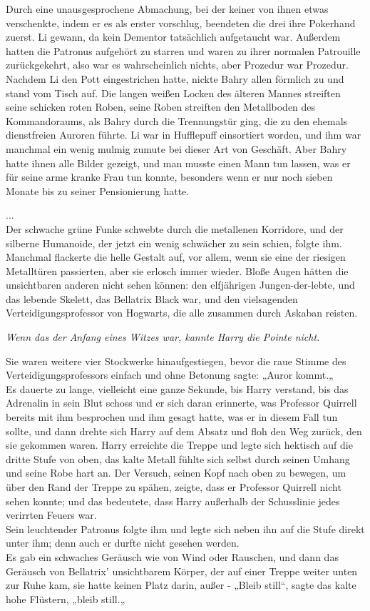 {Durch eine unausgesprochene Abmachung, bei der keiner von ihnen etwas verschenkte, indem er es als erster vorschlug, beendeten die drei ihre Pokerhand zuerst. Li gewann, da kein Dementor tatsächlich aufgetaucht war. Außerdem hatten die Patronus aufgehört zu starren und waren zu ihrer normalen Patrouille zurückgekehrt, also war es wahrscheinlich nichts, aber Prozedur war Prozedur.\\ Nachdem Li den Pott eingestrichen hatte, nickte Bahry allen förmlich zu und stand vom Tisch auf. Die langen weißen Locken des älteren Mannes streiften seine schicken roten Roben, seine Roben streiften den Metallboden des Kommandoraums, als Bahry durch die Trennungstür ging, die zu den ehemals dienstfreien Auroren führte. Li war in Hufflepuff einsortiert worden, und ihm war manchmal ein wenig mulmig zumute bei dieser Art von Geschäft. Aber Bahry hatte ihnen alle Bilder gezeigt, und man musste einen Mann tun lassen, was er für seine arme kranke Frau tun konnte, besonders wenn er nur noch sieben Monate bis zu seiner Pensionierung hatte.

...\\ Der schwache grüne Funke schwebte durch die metallenen Korridore, und der silberne Humanoide, der jetzt ein wenig schwächer zu sein schien, folgte ihm.\\ Manchmal flackerte die helle Gestalt auf, vor allem, wenn sie eine der riesigen Metalltüren passierten, aber sie erlosch immer wieder. Bloße Augen hätten die unsichtbaren anderen nicht sehen können: den elfjährigen Jungen-der-lebte, und das lebende Skelett, das Bellatrix Black war, und den vielsagenden Verteidigungsprofessor von Hogwarts, die alle zusammen durch Askaban reisten.

\emph{Wenn das der Anfang eines Witzes war, kannte Harry die Pointe nicht.}

Sie waren weitere vier Stockwerke hinaufgestiegen, bevor die raue Stimme des Verteidigungsprofessors einfach und ohne Betonung sagte: „Auror kommt.„\\ Es dauerte zu lange, vielleicht eine ganze Sekunde, bis Harry verstand, bis das Adrenalin in sein Blut schoss und er sich daran erinnerte, was Professor Quirrell bereits mit ihm besprochen und ihm gesagt hatte, was er in diesem Fall tun sollte, und dann drehte sich Harry auf dem Absatz und floh den Weg zurück, den sie gekommen waren. Harry erreichte die Treppe und legte sich hektisch auf die dritte Stufe von oben, das kalte Metall fühlte sich selbst durch seinen Umhang und seine Robe hart an. Der Versuch, seinen Kopf nach oben zu bewegen, um über den Rand der Treppe zu spähen, zeigte, dass er Professor Quirrell nicht sehen konnte; und das bedeutete, dass Harry außerhalb der Schusslinie jedes verirrten Feuers war.\\ Sein leuchtender Patronus folgte ihm und legte sich neben ihn auf die Stufe direkt unter ihm; denn auch er durfte nicht gesehen werden.\\ Es gab ein schwaches Geräusch wie von Wind oder Rauschen, und dann das Geräusch von Bellatrix' unsichtbarem Körper, der auf einer Treppe weiter unten zur Ruhe kam, sie hatte keinen Platz darin, außer - „Bleib still“, sagte das kalte hohe Flüstern, „bleib still.„

}
